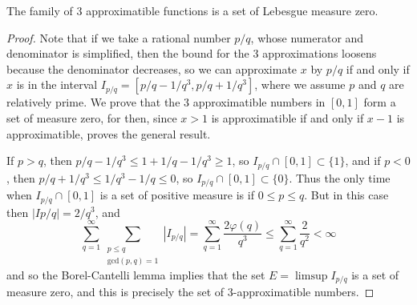 \begin{theorem}
    The family of 3 approximatible functions is a set of Lebesgue measure zero.
\end{theorem}
\begin{proof}
    Note that if we take a rational number $p/q$, whose numerator and denominator is simplified, then the bound for the 3 approximations loosens because the denominator decreases, so we can approximate $x$ by $p/q$ if and only if $x$ is in the interval $I_{p/q} = [p/q - 1/q^3, p/q + 1/q^3]$, where we assume $p$ and $q$ are relatively prime. We prove that the 3 approximatible numbers in $[0,1]$ form a set of measure zero, for then, since $x > 1$ is approximatible if and only if $x - 1$ is approximatible, proves the general result.

    If $p > q$, then $p/q - 1/q^3 \leq 1 + 1/q - 1/q^3 \geq 1$, so $I_{p/q} \cap [0,1] \subset \{ 1 \}$, and if $p < 0$, then $p/q + 1/q^3 \leq 1/q^3 - 1/q \leq 0$, so $I_{p/q} \cap [0,1] \subset \{ 0 \}$. Thus the only time when $I_{p/q} \cap [0,1]$ is a set of positive measure is if $0 \leq p \leq q$. But in this case then $|I{p/q}| = 2/q^3$, and
    \[ \sum_{q = 1}^\infty \sum_{\substack{p \leq q\\\text{gcd}(p,q) = 1}} |I_{p/q}| = \sum_{q = 1}^\infty \frac{2 \varphi(q)}{q^3} \leq \sum_{q = 1}^\infty \frac{2}{q^2} < \infty \]
    and so the Borel-Cantelli lemma implies that the set $E = \limsup I_{p/q}$ is a set of measure zero, and this is precisely the set of 3-approximatible numbers.
\end{proof}

